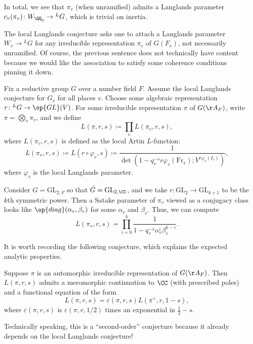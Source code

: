\documentclass[../notes.tex]{subfiles}
\begin{document}
In total, we see that $\pi_v$ (when unramified) admits a Langlands parameter $c_v(\pi_v)\colon W_{\QQ_p}\to{^LG}$, which is trivial on inertia.
\begin{remark}
	The local Langlands conjecture asks one to attach a Langlands parameter $W_v\to{^LG}$ for any irreducible representation $\pi_v$ of $G(F_v)$, not necessarily unramified. Of course, the previous sentence does not technically have content because we would like the association to satisfy some coherence conditions pinning it down.
\end{remark}
\begin{definition}
	Fix a reductive group $G$ over a number field $F$. Assume the local Langlands conjecture for $G_v$ for all places $v$. Choose some algebraic representation $r\colon{^LG}\to\op{GL}(V)$. For some irreducible representation $\pi$ of $G(\AA_F)$, write $\pi=\bigotimes_v\pi_v$, and we define
	\[L(\pi,r,s)\coloneqq\prod_vL(\pi_v,r,s),\]
	where $L(\pi_v,r,s)$ is defined as the local Artin $L$-function:
	\[L(\pi_v,r,s)\coloneqq L(r\circ\varphi_v,s)\coloneqq\frac1{\det\left(1-q_v^{-s}r\varphi_v(\mathrm{Fr}_v);V^{r\varphi_v(I_v)}\right)},\]
	where $\varphi_v$ is the local Langlands parameter.
\end{definition}
\begin{remark}
	Consider $G=\mathrm{GL}_{2,F}$ so that $\check G=\mathrm{GL}_{2,\CC}$, and we take $r\colon\mathrm{GL}_2\to\mathrm{GL}_{k+1}$ to be the $k$th symmetric power. Then a Satake parameter of $\pi_v$ viewed as a conjugacy class looks like $\op{diag}(\alpha_v,\beta_v)$ for some $\alpha_v$ and $\beta_v$. Thus, we can compute
	\[L(\pi_v,r,s)=\prod_{i=0}^k\frac1{1-q_v^{-s}\alpha_v^i\beta_v^{k-i}}.\]
\end{remark}
It is worth recording the following conjecture, which explains the expected analytic properties.
\begin{conj}[Langlands] \label{conj:langlands}
	Suppose $\pi$ is an automorphic irreducible representation of $G(\AA_F)$. Then $L(\pi,r,s)$ admits a meromorphic continuation to $\CC$ (with prescribed poles) and a functional equation of the form
	\[L(\pi,r,s)=\varepsilon(\pi,r,s)L(\pi^\lor,r,1-s),\]
	where $\varepsilon(\pi,r,s)$ is $\varepsilon(\pi,r,1/2)$ times an exponential in $\frac12-s$.
\end{conj}
\begin{remark}
	Technically speaking, this is a ``second-order'' conjecture because it already depends on the local Langlands conjecture!
\end{remark}
\end{document}
